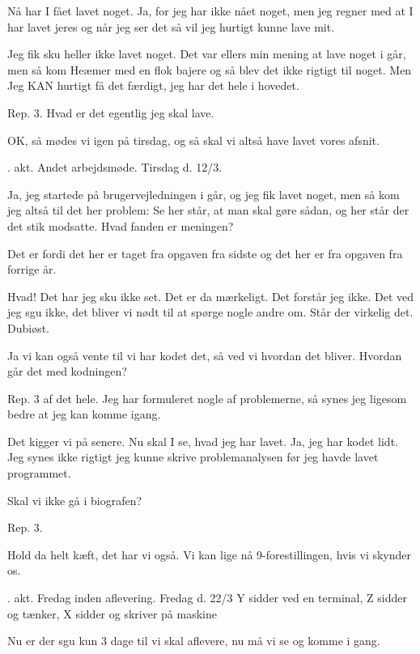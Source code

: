 \documentclass[a4paper,11pt]{article}
\begin{document}
\begin{sketch}
 Nå har I fået lavet noget. Ja, for jeg har ikke nået noget,
men jeg regner med at I har lavet jeres og når jeg ser det så vil
jeg hurtigt kunne lave mit.

 Jeg fik sku heller ikke lavet noget. Det var ellers min
mening at lave noget i går, men så kom Heæmer med en flok bajere
og så blev det ikke rigtigt til noget. Men Jeg KAN hurtigt få det
færdigt, jeg har det hele i hovedet.

 Rep. 3. Hvad er det egentlig jeg skal lave.

 OK, så mødes vi igen på tirsdag, og så skal vi altså have
lavet vores afsnit.

. akt. Andet arbejdsmøde. Tirsdag d. 12/3.

 Ja, jeg startede på brugervejledningen i går, og jeg fik
lavet noget, men så kom jeg altså til det her problem: 
Se  her står, at man skal gøre sådan, og her 
står der det stik modsatte. Hvad fanden er meningen?

 Det er fordi det her 
er taget fra opgaven fra sidste  og det her 
er fra opgaven fra forrige år.

 Hvad! Det har jeg sku ikke set. Det er da mærkeligt. Det forstår
jeg ikke. Det ved jeg sgu ikke, det bliver vi nødt til at spørge nogle
andre om. Står der virkelig det. Dubiøst.

 Ja vi kan også vente til vi har kodet det, så ved vi hvordan
det bliver.  Hvordan går det med kodningen?

 Rep. 3 af det hele. Jeg har formuleret nogle af problemerne,
så synes jeg ligesom bedre at jeg kan komme igang.

 Det kigger vi på senere. Nu skal I se, hvad jeg har lavet. 
Ja, jeg har kodet lidt. Jeg synes ikke rigtigt jeg kunne skrive
problemanalysen før jeg havde lavet programmet. 

 Skal vi ikke gå i biografen?

 Rep. 3.

 Hold da helt kæft, det har vi også. Vi kan lige nå 
9-forestillingen, hvis vi skynder os.

. akt. Fredag inden aflevering. Fredag d. 22/3
Y sidder ved en terminal, Z sidder og tænker, X sidder og skriver på maskine

 Nu er der sgu kun 3 dage til vi skal aflevere, nu må vi se og komme
i gang.


\end{sketch}
\end{document}
